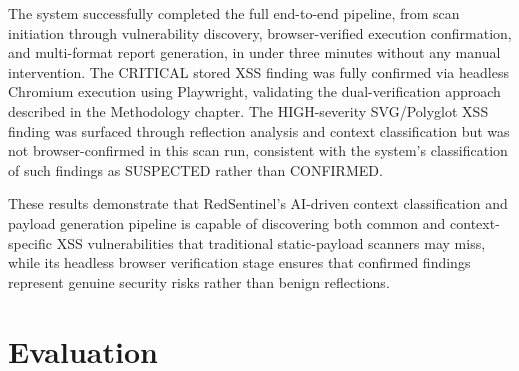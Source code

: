 \begin{table}[h]
\centering
\small
\setlength{\tabcolsep}{4pt}
\renewcommand{\arraystretch}{1.2}


\caption{Summary of Vulnerabilities Discovered}

\end{table}

The system successfully completed the full end-to-end pipeline, from scan initiation
through vulnerability discovery, browser-verified execution confirmation, and multi-format
report generation, in under three minutes without any manual
intervention. The CRITICAL stored XSS finding was fully confirmed via headless
Chromium execution using Playwright, validating the dual-verification approach described
in the Methodology chapter. The HIGH-severity SVG/Polyglot XSS finding was surfaced
through reflection analysis and context classification but was not browser-confirmed in
this scan run, consistent with the system's classification of such findings as SUSPECTED
rather than CONFIRMED.

These results demonstrate that RedSentinel's AI-driven context classification and
payload generation pipeline is capable of discovering both common and context-specific
XSS vulnerabilities that traditional static-payload scanners may miss, while its headless
browser verification stage ensures that confirmed findings represent genuine security
risks rather than benign reflections.

\section{Evaluation}
